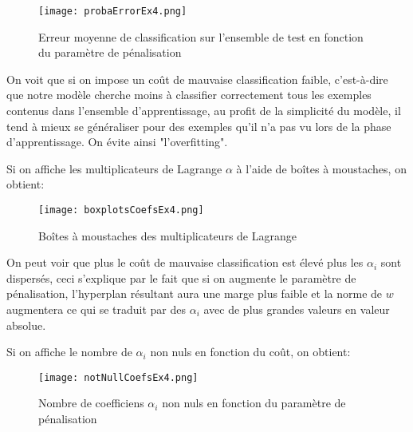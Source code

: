 \documentclass{article}
\begin{document}
\begin{multicols}{2}
\begin{figure}[H]
    \begin{center}
        \texttt{[image: probaErrorEx4.png]}
        \centering
        \captionsetup{justification=centering}
        \caption{\label{fig:errorEx4}Erreur moyenne de classification sur
        l'ensemble de test en fonction du paramètre de pénalisation}
    \end{center}
\end{figure}

On voit que si on impose un coût de mauvaise classification faible, c'est-à-dire
que notre modèle cherche moins à classifier correctement tous les exemples
contenus dans l'ensemble d'apprentissage, au profit de la simplicité du modèle,
il tend à mieux se généraliser pour des exemples qu'il n'a pas vu lors de la
phase d'apprentissage. On évite ainsi "l'overfitting".

Si on affiche les multiplicateurs de Lagrange $\alpha$ à l'aide de boîtes à
moustaches, on obtient:

\begin{figure}[H]
    \begin{center}
        \texttt{[image: boxplotsCoefsEx4.png]}
        \centering
        \captionsetup{justification=centering}
        \caption{\label{fig:boxplotsEx4}Boîtes à moustaches des multiplicateurs
        de Lagrange}
    \end{center}
\end{figure}

On peut voir que plus le coût de mauvaise classification est élevé plus les
$\alpha_i$ sont dispersés, ceci s'explique par le fait que si on augmente le
paramètre de pénalisation, l'hyperplan résultant aura une marge plus faible et
la norme de $w$ augmentera ce qui se traduit par des $\alpha_i$ avec de plus
grandes valeurs en valeur absolue.

Si on affiche le nombre de $\alpha_i$ non nuls en fonction du coût, on obtient:

\begin{figure}[H]
    \begin{center}
        \texttt{[image: notNullCoefsEx4.png]}
        \centering
        \captionsetup{justification=centering}
        \caption{\label{fig:notNullEx4}Nombre de coefficiens $\alpha_i$ non nuls
        en fonction du paramètre de pénalisation}
    \end{center}
\end{figure}


\end{multicols}
\end{document}
